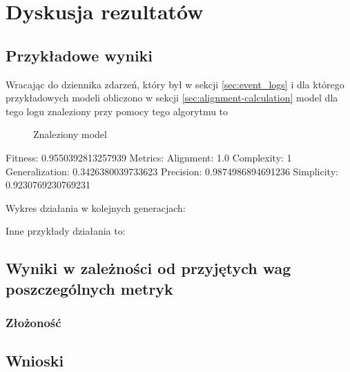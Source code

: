 \chapter{Dyskusja rezultatów}

\section{Przykładowe wyniki}
Wracając do dziennika zdarzeń, który był w sekcji \ref{sec:event_logs} i dla którego przykładowych modeli obliczono w sekcji \ref{sec:alignment-calculation} model dla tego logu znaleziony przy pomocy tego algorytmu to 
\begin{figure}[!ht]
	\caption{\label{fig:flow_chart}Znaleziony model}
\end{figure}



Fitness:
0.9550392813257939
Metrics:
Alignment:	1.0
Complexity:	1
Generalization:	0.3426380039733623
Precision:	0.9874986894691236
Simplicity:	0.9230769230769231

Wykres działania w kolejnych generacjach:

\label{alignment-calculation}
Inne przykłady działania to: 

\section{Wyniki w zależności od przyjętych wag poszczególnych metryk}

\subsection{Złożoność}

\section{Wnioski}
